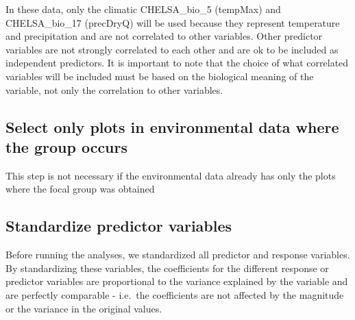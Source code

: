 \documentclass[]{article}
\newenvironment{Shaded}{\begin{snugshade}}{\end{snugshade}}
\newcommand{\CommentTok}[1]{\textcolor[rgb]{0.56,0.35,0.01}{\textit{#1}}}
\newcommand{\KeywordTok}[1]{\textcolor[rgb]{0.13,0.29,0.53}{\textbf{#1}}}
\newcommand{\NormalTok}[1]{#1}
\newcommand{\OperatorTok}[1]{\textcolor[rgb]{0.81,0.36,0.00}{\textbf{#1}}}
\newcommand{\StringTok}[1]{\textcolor[rgb]{0.31,0.60,0.02}{#1}}
\begin{document}
In these data, only the climatic CHELSA\_bio\_5 (tempMax) and
CHELSA\_bio\_17 (precDryQ) will be used because they represent
temperature and precipitation and are not correlated to other variables.
Other predictor variables are not strongly correlated to each other and
are ok to be included as independent predictors. It is important to note
that the choice of what correlated variables will be included must be
based on the biological meaning of the variable, not only the
correlation to other variables.

\hypertarget{select-only-plots-in-environmental-data-where-the-group-occurs}{%
\subsection{Select only plots in environmental data where the group
occurs}\label{select-only-plots-in-environmental-data-where-the-group-occurs}}

This step is not necessary if the environmental data already has only
the plots where the focal group was obtained

\begin{Shaded}
\end{Shaded}

\hypertarget{standardize-predictor-variables}{%
\subsection{Standardize predictor
variables}\label{standardize-predictor-variables}}

Before running the analyses, we standardized all predictor and response
variables. By standardizing these variables, the coefficients for the
different response or predictor variables are proportional to the
variance explained by the variable and are perfectly comparable -
i.e.~the coefficients are not affected by the magnitude or the variance
in the original values.

\begin{Shaded}
\end{Shaded}
\end{document}
